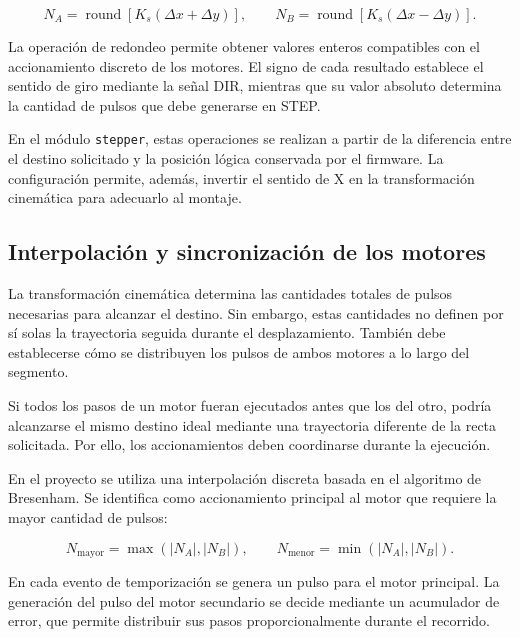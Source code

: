 \documentclass[blue,fullpaper]{ludusofficial}  %
\begin{document}
\begin{equation}
    N_A =
    \operatorname{round}
    \left[K_s(\Delta x + \Delta y)\right],
    \qquad
    N_B =
    \operatorname{round}
    \left[K_s(\Delta x - \Delta y)\right].
    \label{eq:pulsos-corexy}
\end{equation}

La operación de redondeo permite obtener valores
enteros compatibles con el accionamiento discreto
de los motores. El signo de cada resultado establece
el sentido de giro mediante la señal DIR, mientras
que su valor absoluto determina la cantidad
de pulsos que debe generarse en STEP.

En el módulo \texttt{stepper}, estas operaciones
se realizan a partir de la diferencia entre el
destino solicitado y la posición lógica conservada
por el firmware. La configuración permite, además,
invertir el sentido de X en la transformación
cinemática para adecuarlo al montaje.

\subsection{Interpolación y sincronización de los motores}

La transformación cinemática determina las cantidades
totales de pulsos necesarias para alcanzar el destino.
Sin embargo, estas cantidades no definen por sí solas
la trayectoria seguida durante el desplazamiento.
También debe establecerse cómo se distribuyen
los pulsos de ambos motores a lo largo del segmento.

Si todos los pasos de un motor fueran ejecutados
antes que los del otro, podría alcanzarse el mismo
destino ideal mediante una trayectoria diferente
de la recta solicitada. Por ello, los accionamientos
deben coordinarse durante la ejecución.

En el proyecto se utiliza una interpolación discreta
basada en el algoritmo de Bresenham. Se identifica
como accionamiento principal al motor que requiere
la mayor cantidad de pulsos:

\begin{equation}
    N_{\mathrm{mayor}} = \max(|N_A|,|N_B|),
    \qquad
    N_{\mathrm{menor}} = \min(|N_A|,|N_B|).
\end{equation}

En cada evento de temporización se genera un pulso
para el motor principal. La generación del pulso
del motor secundario se decide mediante un acumulador
de error, que permite distribuir sus pasos
proporcionalmente durante el recorrido.
\end{document}
